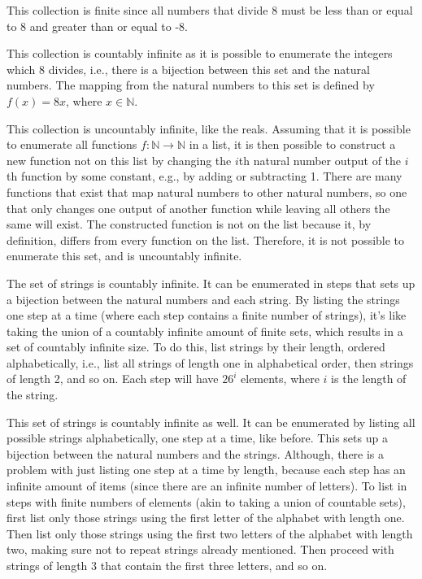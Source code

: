 \documentclass[11pt]{article}
\begin{document}
\begin{solution}
    \begin{Parts}
        
    \Part This collection is finite since all numbers that divide 8 must be less than 
    or equal to 8 and greater than or equal to -8. 

    \Part This collection is countably infinite as it is possible to enumerate the 
    integers which 8 divides, i.e., there is a bijection between this set and
    the natural numbers. The mapping from the natural numbers to this set is 
    defined by $f(x) = 8x$, where $x \in \mathbb{N}$.

    \Part This collection is uncountably infinite, like the reals. Assuming that 
    it is possible to enumerate all functions $f: \mathbb{N} \to \mathbb{N}$ in
    a list, it is then possible to construct a new function not on this list by 
    changing the $i$th natural number output of the $i$th function by some 
    constant, e.g., by adding or subtracting 1. There are many functions that exist 
    that map natural numbers to other natural numbers, so one that only changes 
    one output of another function while leaving all others the same will exist. 
    The constructed function is not on the
    list because it, by definition, differs from every function on the list. 
    Therefore, it is not possible to enumerate this set, and is uncountably infinite. 

    \Part The set of strings is countably infinite. It can be enumerated in steps
    that sets up a bijection between the natural numbers and each string. By listing
    the strings one step at a time (where each step contains a finite number of 
    strings), it's like taking the union of a countably infinite amount of finite 
    sets, which results in a set of countably infinite size. To do this, list strings
    by their length, ordered alphabetically, i.e., list all strings of length one
    in alphabetical order, then strings of length 2, and so on. Each step will have
    $26^i$ elements, where $i$ is the length of the string. 

    \Part This set of strings is countably infinite as well. It can be enumerated
    by listing all possible strings alphabetically, one step at a time, like before.
    This sets up a bijection between the natural numbers and the strings. Although, 
    there is a problem with just listing one step at a time by length, because each
    step has an infinite amount of items (since there are an infinite number of letters). 
    To list in steps with finite numbers of 
    elements (akin to taking a union of countable sets), first list only those 
    strings using the first letter of the alphabet with length one. Then list only
    those strings using the first two letters of the alphabet with length two, 
    making sure not to repeat strings already mentioned. Then proceed with strings 
    of length 3 that contain the first three letters, and so on.


\end{Parts}
\end{solution}
\end{document}

